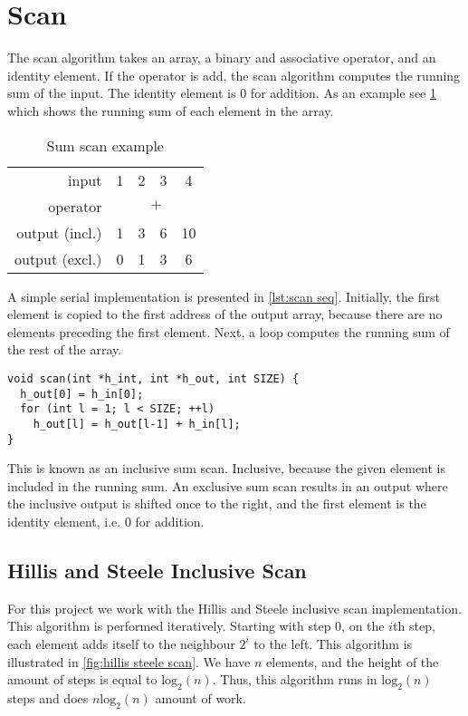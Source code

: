 \section{Scan}
\label{sec:scan}

The scan algorithm takes an array, a binary and associative operator, and an identity element.
If the operator is add, the scan algorithm computes the running sum of the input.
The identity element is 0 for addition.
As an example see \cref{tab:scan example} which shows the running sum of each element in the array.

\begin{table}[htb]
  \centering
  \begin{tabular}{r | c c c c}
    \toprule
    input & 1 & 2 & 3 & 4 \\
    operator & \multicolumn{4}{c}{$\mathtt{+}$} \\
    output (incl.) & 1 & 3 & 6 & 10 \\
    output (excl.) & 0 & 1 & 3 & 6 \\
    \bottomrule
  \end{tabular}
  \caption{Sum scan example}
  \label{tab:scan example}
\end{table}
    
A simple serial implementation is presented in \cref{lst:scan seq}.
Initially, the first element is copied to the first address of the output array, because there are no elements preceding the first element.
Next, a loop computes the running sum of the rest of the array.

\begin{lstlisting}[caption={Serial scan}, label={lst:scan seq}]
void scan(int *h_int, int *h_out, int SIZE) {
  h_out[0] = h_in[0];
  for (int l = 1; l < SIZE; ++l)
    h_out[l] = h_out[l-1] + h_in[l];
}
\end{lstlisting}

This is known as an inclusive sum scan.
Inclusive, because the given element is included in the running sum.
An exclusive sum scan results in an output where the inclusive output is shifted once to the right, and the first element is the identity element, i.e. 0 for addition.

\subsection{Hillis and Steele Inclusive Scan}
\label{sec:hillis and steele scan}

For this project we work with the Hillis and Steele inclusive scan implementation.
This algorithm is performed iteratively.
Starting with step 0, on the $i$th step, each element adds itself to the neighbour $2^i$ to the left.
This algorithm is illustrated in \cref{fig:hillis steele scan}.
We have $n$ elements, and the height of the amount of steps is equal to $\mathrm{log}_2(n)$.
Thus, this algorithm runs in $\mathrm{log}_2(n)$ steps and does $n \mathrm{log}_2(n)$ amount of work.

